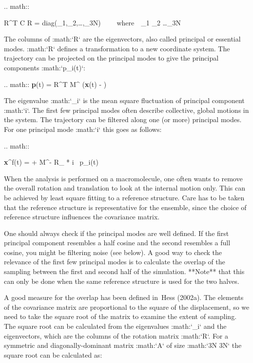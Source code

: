 .. math::

   R^T C R = \mbox{diag}(\lambda_1,\lambda_2,\ldots,\lambda_{3N})
   ~~~~\mbox{where}~~\lambda_1 \geq \lambda_2 \geq \ldots \geq \lambda_{3N}

The columns of :math:`R` are the eigenvectors, also called principal or
essential modes. :math:`R` defines a transformation to a new coordinate
system. The trajectory can be projected on the principal modes to give
the principal components :math:`p_i(t)`:

.. math:: {\bf p}(t) = R^T M^{} ({\bf x}(t) -  \rangle)

The eigenvalue :math:`\lambda_i` is the mean square fluctuation of
principal component :math:`i`. The first few principal modes often
describe collective, global motions in the system. The trajectory can be
filtered along one (or more) principal modes. For one principal mode
:math:`i` this goes as follows:

.. math::

   {\bf x}^f(t) =
    \rangle + M^{-} R_{ * i} \, p_i(t)

When the analysis is performed on a macromolecule, one often wants to
remove the overall rotation and translation to look at the internal
motion only. This can be achieved by least square fitting to a reference
structure. Care has to be taken that the reference structure is
representative for the ensemble, since the choice of reference structure
influences the covariance matrix.

One should always check if the principal modes are well defined. If the
first principal component resembles a half cosine and the second
resembles a full cosine, you might be filtering noise (see below). A
good way to check the relevance of the first few principal modes is to
calculate the overlap of the sampling between the first and second half
of the simulation. **Note** that this can only be done when the same
reference structure is used for the two halves.

A good measure for the overlap has been defined in Hess (2002a). The
elements of the covariance matrix are proportional to the square of the
displacement, so we need to take the square root of the matrix to
examine the extent of sampling. The square root can be calculated from
the eigenvalues :math:`\lambda_i` and the eigenvectors, which are the
columns of the rotation matrix :math:`R`. For a symmetric and
diagonally-dominant matrix :math:`A` of size :math:`3N \times 3N` the
square root can be calculated as:

